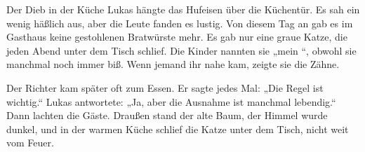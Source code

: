\documentclass[12pt]{nextbook}
\begin{document}
\begin{readersection}{Der Dieb in der Küche}
Lukas hängte das Hufeisen über die Küchentür. Es sah ein wenig häßlich aus, aber die Leute fanden es lustig. Von diesem Tag an gab es im Gasthaus keine gestohlenen Bratwürste mehr. Es gab nur eine graue Katze, die jeden Abend unter dem Tisch schlief. Die Kinder nannten sie „mein “, obwohl sie manchmal noch immer biß. Wenn jemand ihr  nahe kam, zeigte sie die Zähne.

Der Richter kam später oft zum Essen. Er sagte jedes Mal: „Die Regel ist wichtig.“ Lukas antwortete: „Ja, aber die Ausnahme ist manchmal lebendig.“ Dann lachten die Gäste. Draußen stand der alte Baum, der Himmel wurde dunkel, und in der warmen Küche schlief die Katze unter dem Tisch, nicht weit vom Feuer.

\end{readersection}
\end{document}
